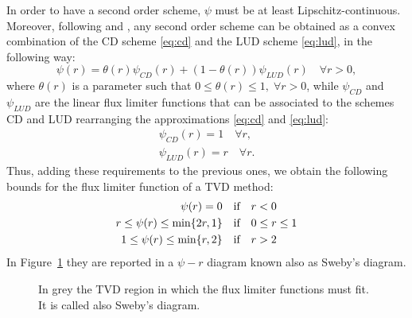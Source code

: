 In order to have a second order scheme, $\psi$ must be at least 
Lipschitz-continuous. Moreover, following \cite{tvd:sweeby} and 
\cite{tvd:vanleer}, any second order scheme 
can be obtained as a convex combination of the CD scheme \eqref{eq:cd} and the 
LUD scheme \eqref{eq:lud}, in the following way:
\begin{equation}
	\psi(r) = \theta(r) \psi_{CD}(r) + (1-\theta(r))\psi_{LUD}(r) \quad \forall 
	r >0,
\end{equation}
where $\theta(r)$ is a parameter such that $0 \leq \theta(r) \leq 1,\; \forall 
r>0$, while $\psi_{CD}$ and $\psi_{LUD}$ are the linear flux limiter functions 
that can be associated to the schemes CD and LUD rearranging the 
approximations \eqref{eq:cd} and \eqref{eq:lud}:
\begin{gather}
	\psi_{CD}(r) = 1 \quad \forall r,\\
	\psi_{LUD}(r) = r \quad \forall r.
\end{gather}
Thus, adding these requirements to the previous ones, we 
obtain the following bounds for the flux limiter function of a TVD method:
\begin{align}
\psi(r) = 0 \quad &\text{if} \quad r < 0 \notag \\
\label{eq:tvdbounds} r \leq \psi(r) \leq \min \{2r, 1\} \quad &\text{if} \quad 
0 
\leq r \leq 1\\
1 \leq \psi(r) \leq \min \{r, 2 \} \quad &\text{if} \quad r > 2 \notag
\end{align}
In Figure~\ref{fig:tvdregion} they are reported in a $\psi-r$ diagram known 
also as Sweby's diagram.
\begin{figure}
	\centering
	
	\caption[TVD region (Sweby's diagram)]{In grey the TVD region in which 
	the flux 
	limiter functions must fit. It is called also Sweby's diagram.}
	\label{fig:tvdregion}
\end{figure}
